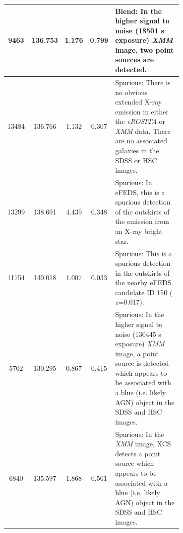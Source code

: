 \documentclass[fleqn,usenatbib]{mnras}
\begin{document}
\begin{table}
\begin{center}
\begin{tabular}{cccc|p{0.70\linewidth}}
\hline
9463 & 136.753 & 1.176 & 0.799 & Blend: In the higher signal to noise (18501 s exposure) {\em XMM} image, two point sources are detected. \\ 
\hline
13484 & 136.766 & 1.132 & 0.307 & Spurious: There is no obvious extended X-ray emission in either the {\em eROSITA} or {\em XMM} data.  There are no associated galaxies in the SDSS or HSC images. \\ 
\hline
13299 & 138.691 & 4.439 & 0.348 & Spurious: In eFEDS, this is a spurious detection of the outskirts of the emission from an X-ray bright star. \\ 
\hline
11754 & 140.018 & 1.007 & 0.033 & Spurious: This is a spurious detection in the outskirts of the nearby eFEDS candidate ID 150 ($z$=0.017). \\ 
\hline
5702 & 130.295 & 0.867 & 0.415 & Spurious: In the higher signal to noise (130445 s exposure) {\em XMM} image, a point source is detected which appears to be associated with a  blue (i.e. likely AGN) object in the SDSS and HSC images.\\
\hline
6840 & 135.597 & 1.868 & 0.561 & Spurious: In the {\em XMM} image, XCS detects a point source which appears to be associated with a  blue (i.e. likely AGN) object in the SDSS and HSC images. \\ 
\hline
\end{tabular}
\end{center}
\end{table}
\end{document}
